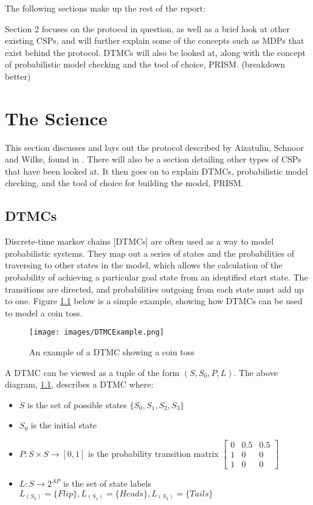 \documentclass{l4proj}
\begin{document}
The following sections make up the rest of the report:

Section 2 focuses on the protocol in question, as well as a brief look at other existing CSPs, and will further explain some of the concepts such as MDPs that exist behind the protocol. DTMCs will also be looked at, along with the concept of probabilistic model checking and the tool of choice, PRISM. (breakdown better)

\chapter{The Science}
This section discusses and lays out the protocol described by Aizatulin, Schnoor and Wilke, found in \cite{ASW09}. There will also be a section detailing other types of CSPs that have been looked at. It then goes on to explain DTMCs, probabilistic model checking, and the tool of choice for building the model, PRISM.

\section{DTMCs}
Discrete-time markov chains [DTMCs] are often used as a way to model probabilistic systems. They map out a series of states and the probabilities of traversing to other states in the model, which allows the calculation of the probability of achieving a particular goal state from an identified start state. The transitions are directed, and probabilities outgoing from each state must add up to one. Figure \ref{dtmc} below is a simple example, showing how DTMCs can be used to model a coin toss.

\begin{figure}[ht!]
\centering
\texttt{[image: images/DTMCExample.png]}
\caption{An example of a DTMC showing a coin toss}
\label{dtmc}
\end{figure}


A DTMC can be viewed as a tuple of the form $(S, S{_0}, P, L)$. The above diagram, \ref{dtmc}, describes a DTMC where:
\begin{itemize}
\item{$S$ is the set of possible states $\lbrace S_0, S_1, S_2, S_3 \rbrace $}
\item{$S{_0}$ is the initial state}
\item{$P : S \times S \rightarrow [0,1]$ is the probability transition matrix $\begin{bmatrix}
0 & 0.5 & 0.5\\ 
1 & 0 & 0\\ 
1 & 0 & 0
\end{bmatrix}$}
\item{$L : S \rightarrow 2^{AP}$ is the set of state labels $L_{(S_0)}=\lbrace Flip \rbrace , L_{(S_1)}=\lbrace Heads \rbrace , L_{(S_2)}=\lbrace Tails \rbrace$}
\end{itemize}
\end{document}
